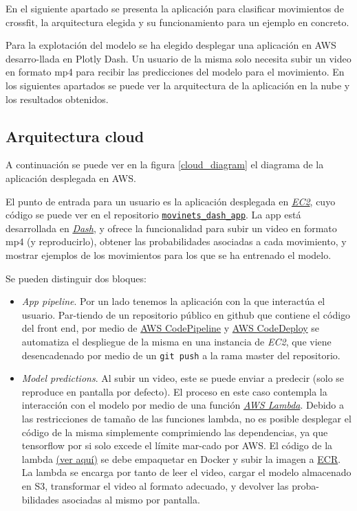 En el siguiente apartado se presenta la aplicación para clasificar movimientos de crossfit, la arquitectura elegida y su funcionamiento para un ejemplo en concreto.

Para la explotación del modelo se ha elegido desplegar una aplicación en AWS desarro-llada en Plotly Dash. Un usuario de la misma solo necesita subir un video en formato mp4 para recibir las predicciones del modelo para el movimiento. En los siguientes apartados se puede ver la arquitectura de la aplicación en la nube y los resultados obtenidos.

\subsection{Arquitectura cloud}

A continuación se puede ver en la figura \ref{cloud_diagram} el diagrama de la aplicación desplegada en AWS.

El punto de entrada para un usuario es la aplicación desplegada en \href{https://aws.amazon.com/es/ec2/}{\textit{EC2}}, cuyo código se puede ver en el repositorio \href{https://github.com/plaguss/movinets_dash_app}{\texttt{movinets\_dash\_app}}. La app está desarrollada en \href{https://plotly.com/dash/}{\textit{Dash}}, y ofrece la funcionalidad para subir un video en formato mp4 (y reproducirlo), obtener las probabilidades asociadas a cada movimiento, y mostrar ejemplos de los movimientos para los que se ha entrenado el modelo.

Se pueden distinguir dos bloques:
%
\begin{itemize}%
%
\item \textit{App pipeline}.
Por un lado tenemos la aplicación con la que interactúa el usuario.
Par-tiendo de un repositorio público en github que contiene el código del front end, por medio de \href{https://aws.amazon.com/es/codepipeline/}{AWS CodePipeline} y \href{https://aws.amazon.com/es/codedeploy/}{AWS CodeDeploy} se automatiza el despliegue de la misma en una instancia de \textit{EC2}, que viene desencadenado por medio de un \texttt{git push} a la rama master del repositorio.

\item \textit{Model predictions}.
Al subir un video, este se puede enviar a predecir (solo se reproduce en pantalla por defecto). El proceso en este caso contempla la interacción con el modelo por medio de una función \href{https://aws.amazon.com/es/lambda/}{\textit{AWS Lambda}}. Debido a las restricciones de tamaño de las funciones lambda, no es posible desplegar el código de la misma simplemente comprimiendo las dependencias, ya que tensorflow por si solo excede el límite mar-cado por AWS. El código de la lambda \href{https://github.com/plaguss/tfm-misc/tree/main/lambda_aws}{(ver aquí)} se debe empaquetar en Docker y subir la imagen a \href{https://aws.amazon.com/es/ecr/}{ECR}. La lambda se encarga por tanto de leer el video, cargar el modelo almacenado en S3, transformar el video al formato adecuado, y devolver las proba-bilidades asociadas al mismo por pantalla.

\end{itemize}


